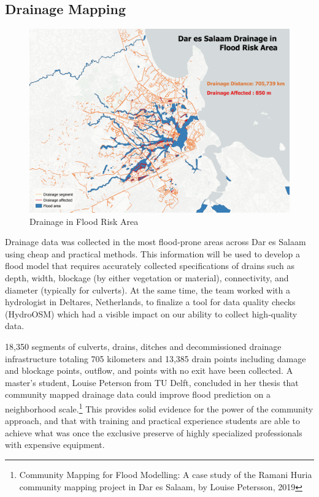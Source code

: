 \documentclass[a4paper,12pt,twoside]{article}
\begin{document}
\subsection{Drainage Mapping}
\begin{figure}[h]
    \centering
    \includegraphics[width=.8\textwidth]{images/drainmap_min.png}
    \caption{Drainage in Flood Risk Area}
    \label{fig:my_label}
\end{figure}
\begin{multicols}{2}
Drainage data was collected in the most flood-prone areas across Dar es Salaam using cheap and practical methods. This information will be used to develop a flood model that requires accurately collected specifications of drains such as depth, width, blockage (by either vegetation or material), connectivity, and diameter (typically for culverts). At the same time, the team worked with a hydrologist in Deltares, Netherlands, to finalize a tool for data quality checks (HydroOSM) which had a visible impact on our ability to collect high-quality data. 

18,350 segments of culverts, drains, ditches and decommissioned drainage infrastructure totaling 705 kilometers and 13,385 drain points including damage and blockage points, outflow, and points with no exit have been collected. A master’s student, Louise Peterson from TU Delft, concluded in her thesis that community mapped drainage data could improve flood prediction on a neighborhood scale.\footnote{ Community Mapping for Flood Modelling: A case study of the Ramani Huria community mapping project in Dar es Salaam, by Louise Petersson, 2019} This provides solid evidence for the power of the community approach, and that with training and practical experience students are able to achieve what was once the exclusive preserve of highly specialized professionals with expensive equipment. 
\end{multicols}
\end{document}
